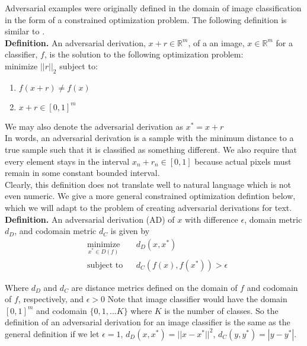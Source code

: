Adversarial examples were originally defined in the domain of image classification in the form of a constrained optimization problem.  The following definition is similar to \cite{cs14}.\\

\noindent
\textbf{Definition.} An adversarial derivation, $x + r \in \mathbb{R}^m$, of a an image, $x \in \mathbb{R}^m$ for a classifier, $f$, is the solution to the following optimization problem:\\
\noindent
minimize $||r||_2$ subject to:
\begin{enumerate}
\item $f(x + r) \neq f(x)$
\item $x+r \in [0,1]^m$
\end{enumerate}
We may also denote the adversarial derivation as $x^* = x + r$\\

\noindent
In words, an adversarial derivation is a sample with the minimum distance to a true sample such that it is classified as something different.  We also require that every element stays in the interval $x_n+r_n \in [0,1]$ because actual pixels must remain in some constant bounded interval.\\

\noindent
Clearly, this definition does not translate well to natural language which is not even numeric.  We give a more general constrained optimization defintion below, which we will adapt to the problem of creating adversarial derivations for text.\\

\noindent
\textbf{Definition.} An adversarial derivation (AD) of $x$ with difference $\epsilon$, domain metric $d_D$, and codomain metric $d_C$ is given by\\
\begin{equation*}
\begin{aligned}
& \underset{x^*\in D(f)}{\text{minimize}}
& & d_D(x,x^*) \\
& \text{subject to}
& & d_C(f(x),f(x^*)) > \epsilon
\end{aligned}
\end{equation*}

\noindent
Where $d_D$ and $d_C$ are distance metrics defined on the domain of $f$ and codomain of $f$, respectively, and $\epsilon > 0$  Note that image classifier would have the domain $[0,1]^m$ and codomain $ \{0,1,...K\} $ where $K$ is the number of classes.  So the definition of an adversarial derivation for an image classifier is the same as the general definition if we let $\epsilon = 1$, $d_D(x,x^*) = ||x-x^*||^2$, $d_C(y,y^*) = |y-y^*|$.

